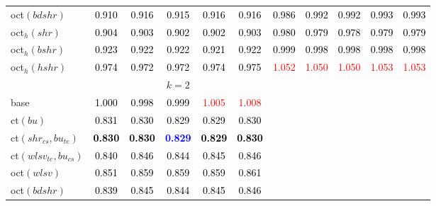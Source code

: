 \begin{tabular}[t]{l|>{}cccc>{}c|ccccc}
oct$(bdshr)$ & \textcolor{black}{0.910} & \textcolor{black}{0.916} & \textcolor{black}{0.915} & \textcolor{black}{0.916} & \textcolor{black}{0.916} & \textcolor{black}{0.986} & \textcolor{black}{0.992} & \textcolor{black}{0.992} & \textcolor{black}{0.993} & \textcolor{black}{0.993}\\
oct$_h(shr)$ & \textcolor{black}{0.904} & \textcolor{black}{0.903} & \textcolor{black}{0.902} & \textcolor{black}{0.902} & \textcolor{black}{0.903} & \textcolor{black}{0.980} & \textcolor{black}{0.979} & \textcolor{black}{0.978} & \textcolor{black}{0.979} & \textcolor{black}{0.979}\\
oct$_h(bshr)$ & \textcolor{black}{0.923} & \textcolor{black}{0.922} & \textcolor{black}{0.922} & \textcolor{black}{0.921} & \textcolor{black}{0.922} & \textcolor{black}{0.999} & \textcolor{black}{0.998} & \textcolor{black}{0.998} & \textcolor{black}{0.998} & \textcolor{black}{0.998}\\
oct$_h(hshr)$ & \textcolor{black}{0.974} & \textcolor{black}{0.972} & \textcolor{black}{0.972} & \textcolor{black}{0.974} & \textcolor{black}{0.975} & \textcolor{red}{1.052} & \textcolor{red}{1.050} & \textcolor{red}{1.050} & \textcolor{red}{1.053} & \textcolor{red}{1.053}\\
\addlinespace[0.3em]
\multicolumn{1}{c}{} & \multicolumn{5}{c}{\textbf{$k = 2$}} & \multicolumn{5}{c}{}\\
base & \textcolor{black}{1.000} & \textcolor{black}{0.998} & \textcolor{black}{0.999} & \textcolor{red}{1.005} & \textcolor{red}{1.008} &  &  &  &  & \\
ct$(bu)$ & \textcolor{black}{0.831} & \textcolor{black}{0.830} & \textcolor{black}{0.829} & \textcolor{black}{0.829} & \textcolor{black}{0.830} &  &  &  &  & \\
ct$(shr_{cs}, bu_{te})$ & \textcolor{black}{\textbf{0.830}} & \textcolor{black}{\textbf{0.830}} & \textcolor{blue}{\textbf{0.829}} & \textcolor{black}{\textbf{0.829}} & \textcolor{black}{\textbf{0.830}} &  &  &  &  & \\
ct$(wlsv_{te}, bu_{cs})$ & \textcolor{black}{0.840} & \textcolor{black}{0.846} & \textcolor{black}{0.844} & \textcolor{black}{0.845} & \textcolor{black}{0.846} &  &  &  &  & \\
oct$(wlsv)$ & \textcolor{black}{0.851} & \textcolor{black}{0.859} & \textcolor{black}{0.859} & \textcolor{black}{0.859} & \textcolor{black}{0.861} &  &  &  &  & \\
oct$(bdshr)$ & \textcolor{black}{0.839} & \textcolor{black}{0.845} & \textcolor{black}{0.844} & \textcolor{black}{0.845} & \textcolor{black}{0.846} &  &  &  &  & \\

\end{tabular}

